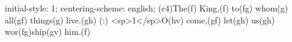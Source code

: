 initial-style: 1;
centering-scheme: english;
(c4)The(f) King,(f) to(fg) whom(g) all(gf) things(g) live.(gh) (:) <sp>1</sp>O(hv) come,(gf) let(gh) us(gh) wor(fg)ship(gv) him.(f)
